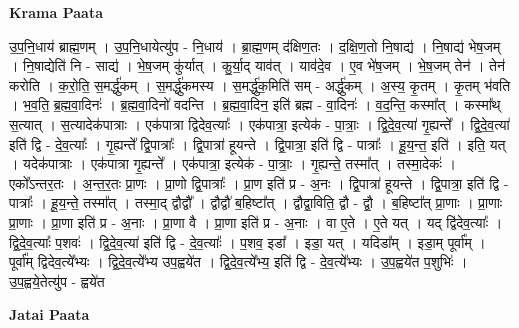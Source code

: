 \documentclass[17pt]{extarticle}
\begin{document}
\textbf{Krama Paata} \newline

उ॒प॒नि॒धाय॑ ब्राह्म॒णम् । उ॒प॒नि॒धायेत्यु॑प - नि॒धाय॑ । ब्रा॒ह्म॒णम् द॑क्षिण॒तः । द॒क्षि॒ण॒तो नि॒षाद्य॑ । नि॒षाद्य॑ भेष॒जम् । नि॒षाद्येति॑ नि - साद्य॑ । भे॒ष॒जम् कु॑र्यात् । कु॒र्या॒द् याव॑त् । याव॑दे॒व । ए॒व भे॑ष॒जम् । भे॒ष॒जम् तेन॑ । तेन॑ करोति । क॒रो॒ति॒ स॒मर्द्धु॑कम् । स॒मर्द्धु॑कमस्य । स॒मर्द्धु॑क॒मिति॑ सम् - अर्द्धु॑कम् । अ॒स्य॒ कृ॒तम् । कृ॒तम् भ॑वति । भ॒व॒ति॒ ब्र॒ह्म॒वा॒दिनः॑ । ब्र॒ह्म॒वा॒दिनो॑ वदन्ति । ब्र॒ह्म॒वा॒दिन॒ इति॑ ब्रह्म - वा॒दिनः॑ । व॒द॒न्ति॒ कस्मा᳚त् । कस्मा᳚थ् स॒त्यात् । स॒त्यादेक॑पात्राः । एक॑पात्रा द्विदेव॒त्याः᳚ । एक॑पात्रा॒ इत्येक॑ - पा॒त्राः॒ । द्वि॒दे॒व॒त्या॑ गृ॒ह्यन्ते᳚ । द्वि॒दे॒व॒त्या॑ इति॑ द्वि - दे॒व॒त्याः᳚ । गृ॒ह्यन्ते᳚ द्वि॒पात्राः᳚ । द्वि॒पात्रा॑ हूयन्ते । द्वि॒पात्रा॒ इति॑ द्वि - पात्राः᳚ । हू॒य॒न्त॒ इति॑ । इति॒ यत् । यदेक॑पात्राः । एक॑पात्रा गृ॒ह्यन्ते᳚ । एक॑पात्रा॒ इत्येक॑ - पा॒त्राः॒ । गृ॒ह्यन्ते॒ तस्मा᳚त् । तस्मा॒देकः॑ । एको᳚ऽन्तर॒तः । अ॒न्त॒र॒तः प्रा॒णः । प्रा॒णो द्वि॒पात्राः᳚ । प्रा॒ण इति॑ प्र - अ॒नः । द्वि॒पात्रा॑ हूयन्ते । द्वि॒पात्रा॒ इति॑ द्वि - पात्राः᳚ । हू॒य॒न्ते॒ तस्मा᳚त् । तस्मा॒द् द्वौद्वौ᳚ । द्वौद्वौ॑ ब॒हिष्टा᳚त् । द्वौद्वा॒विति॒ द्वौ - द्वौ॒ । ब॒हिष्टा᳚त् प्रा॒णाः । प्रा॒णाः प्रा॒णाः । प्रा॒णा इति॑ प्र - अ॒नाः । प्रा॒णा वै । प्रा॒णा इति॑ प्र - अ॒नाः । वा ए॒ते । ए॒ते यत् । यद् द्वि॑देव॒त्याः᳚ । द्वि॒दे॒व॒त्याः᳚ प॒शवः॑ । द्वि॒दे॒व॒त्या॑ इति॑ द्वि - दे॒व॒त्याः᳚ । प॒शव॒ इडा᳚ । इडा॒ यत् । यदिडा᳚म् । इडा॒म् पूर्वा᳚म् । पूर्वा᳚म् द्विदेव॒त्ये᳚भ्यः । द्वि॒दे॒व॒त्ये᳚भ्य उप॒ह्वये॑त । द्वि॒दे॒व॒त्ये᳚भ्य॒ इति॑ द्वि - दे॒व॒त्ये᳚भ्यः । उ॒प॒ह्वये॑त प॒शुभिः॑ । उ॒प॒ह्वये॒तेत्यु॑प - ह्वये॑त \newline

\textbf{Jatai Paata} \newline
\end{document}
